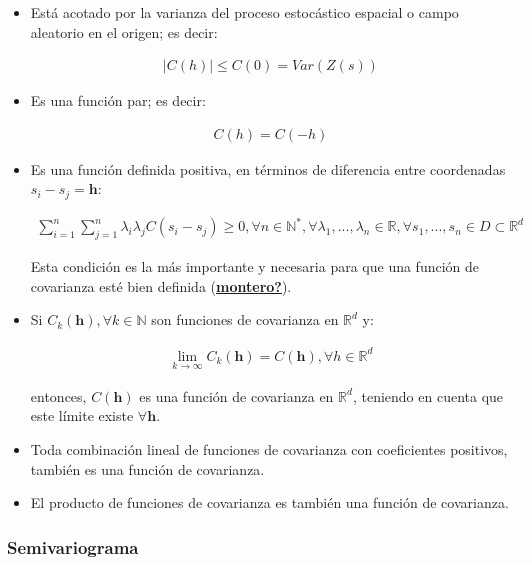 \documentclass[
]{book}
\begin{document}
\begin{itemize}
\item
  Está acotado por la varianza del proceso estocástico espacial o campo aleatorio en el origen; es decir:

  \begin{align}
      |C(h)|\leq C(0)=Var(Z(s))  
    \end{align}
\item
  Es una función par; es decir:

  \begin{align}
      C(h)=C(-h)  
    \end{align}
\item
  Es una función definida positiva, en términos de diferencia entre coordenadas \(s_i-s_j=\textbf{h}\):

  \begin{align}
      \sum_{i=1}^n \sum_{j=1}^n\lambda_i \lambda_j C(s_i-s_j)\geq 0,\forall n\in \mathbb{N}^*,\forall \lambda_1,...,\lambda_n \in \mathbb{R}, \forall s_1,...,s_n\in D \subset \mathbb{R}^d  
    \end{align}

  Esta condición es la más importante y necesaria para que una función de covarianza esté bien definida (\protect\hyperlink{ref-montero}{\textbf{montero?}}).
\item
  Si \(C_k(\textbf{h}),\forall k \in \mathbb{N}\) son funciones de covarianza en \(\mathbb{R}^d\) y:

  \begin{align}
      \lim_{k\to \infty}C_{k}(\textbf{h})=C(\textbf{h}),\forall h \in \mathbb{R}^d  
    \end{align}

  entonces, \(C(\textbf{h})\) es una función de covarianza en \(\mathbb{R}^d\), teniendo en cuenta que este límite existe \(\forall \textbf{h}\).
\item
  Toda combinación lineal de funciones de covarianza con coeficientes positivos, también es una función de covarianza.
\item
  El producto de funciones de covarianza es también una función de covarianza.
\end{itemize}

\hypertarget{semivariograma}{%
\subsubsection*{Semivariograma}\label{semivariograma}}
\end{document}
